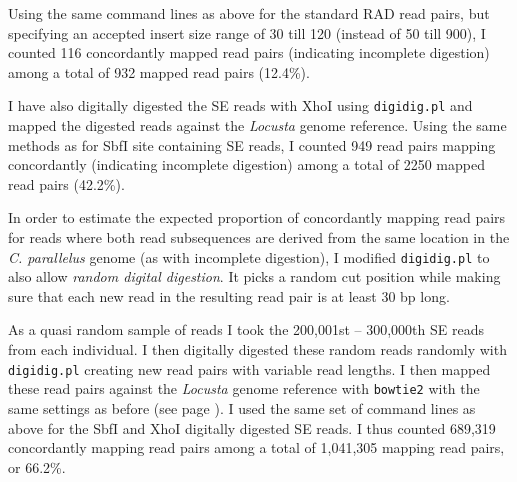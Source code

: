 \documentclass[a4paper,12pt,times,print,index,custombib,custommargin]{PhDThesisPSnPDF}\usepackage[]{graphicx}\usepackage[]{color}
\begin{document}
Using the same command lines as above for the standard RAD read pairs, but specifying an accepted insert size range of 30 till 120 (instead of 50 till 900), I counted 116 \gls{concordant}ly mapped read pairs (indicating incomplete digestion) among a total of 932 mapped read pairs (12.4\%).

I have also digitally digested the SE reads with XhoI using \texttt{digidig.pl} and mapped the digested reads against the \textit{Locusta} genome reference. Using the same methods as for SbfI site containing SE reads, I counted 949 read pairs mapping concordantly (indicating incomplete digestion) among a total of 2250 mapped read pairs (42.2\%).

%
%

In order to estimate the expected proportion of \gls{concordant}ly mapping read pairs for reads where both read subsequences are derived from the same location in the \textit{C. parallelus} genome (as with incomplete digestion), I modified \texttt{digidig.pl} to also allow \emph{random digital digestion}. It picks a random cut position while making sure that each new read in the resulting read pair is at least 30 bp long. 

As a quasi random sample of reads I took the 200,001st -- 300,000th SE reads  from each individual. I then digitally digested these random reads randomly with \texttt{digidig.pl} creating new read pairs with variable read lengths. I then mapped these read pairs against the \textit{Locusta} genome reference with \texttt{bowtie2} with the same settings as before (see page \pageref{read_pair_mapping_analysis}). I used the same set of command lines as above for the SbfI and XhoI digitally digested SE reads. I thus counted 689,319 \gls{concordant}ly mapping read pairs among a total of 1,041,305 mapping read pairs, or 66.2\%.
\end{document}
